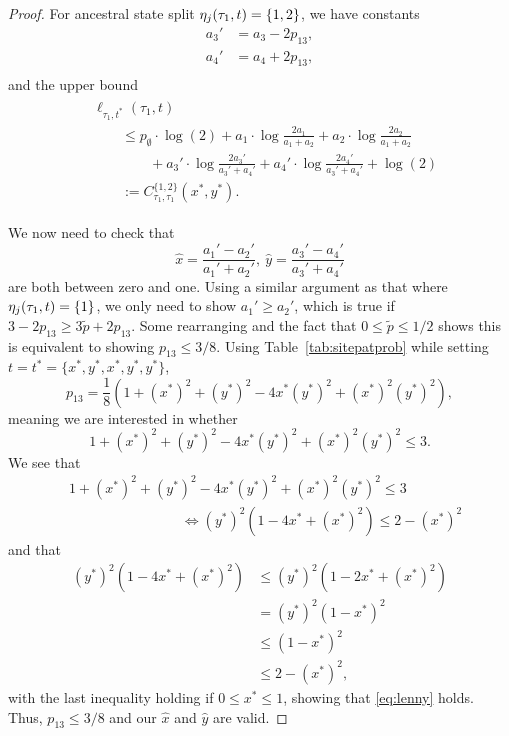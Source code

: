 \begin{proof}
For ancestral state split $\eta_j(\tau_1, t) = \{1,2\}$, we have constants
\begin{equation}
    \begin{aligned}
        a_{3}' &= a_{3}-2p_{13}, \\
        a_{4}' &= a_{4}+2p_{13}, \\
    \end{aligned}
    \label{eq:a_const_prime_y}
\end{equation}
and the upper bound
\begin{align}
\begin{split}
&    \ell_{\tau_1,t^*}(\tau_1, t) \\
&\qquad\le      p_{\emptyset}  \cdot\log(2)
+ a_{1}\cdot\log\frac{2a_{1}}{a_{1}+a_{2}}
+ a_{2}\cdot\log\frac{2a_{2}}{a_{1}+a_{2}} \\
&\qquad\qquad+ a_{3}'\cdot\log\frac{2a_{3}'}{a_{3}'+a_{4}'}
+ a_{4}'\cdot\log\frac{2a_{4}'}{a_{3}'+a_{4}'}
+ \log(2) \\
&\qquad := C^{\{1,2\}}_{\tau_1,\tau_1}(x^*, y^*).
\end{split}
\label{eq:farris-upper-bound-12}
\end{align}

We now need to check that
\[
\hat{x} = \frac{a_{1}'-a_{2}'}{a_{1}'+a_{2}'}, \ \hat{y} = \frac{a_{3}'-a_{4}'}{a_{3}'+a_{4}'}
\]
are both between zero and one.
Using a similar argument as that where $\eta_j(\tau_1, t) = \{1\}$, we only need to show $a_1' \ge a_2'$, which is true if $3-2p_{13} \ge 3\tilde{p}+2p_{13}$.
Some rearranging and the fact that $0 \le \tilde{p} \le 1/2$ shows this is equivalent to showing $p_{13} \le 3/8$.
Using Table~\ref{tab:sitepatprob} while setting $t=t^*=\{x^*,y^*,x^*,y^*,y^*\}$,
\[
p_{13} = \frac{1}{8}\left(1 + (x^*)^2 + (y^*)^2 - 4x^*(y^*)^2 + (x^*)^2(y^*)^2\right),
\]
meaning we are interested in whether
\begin{equation}
1 + (x^*)^2 + (y^*)^2 - 4x^*(y^*)^2 + (x^*)^2(y^*)^2 \le 3.
\label{eq:generating_ineq}
\end{equation}
We see that
\begin{equation}
\begin{split}
& 1 + (x^*)^2 + (y^*)^2 - 4x^*(y^*)^2 + (x^*)^2(y^*)^2 \le 3 \\
& \qquad \qquad \qquad \qquad \iff (y^*)^2\left(1 - 4x^* + (x^*)^2\right) \le 2 - (x^*)^2
\end{split}
\label{eq:lenny}
\end{equation}
and that
\begin{align*}
(y^*)^2\left(1 - 4x^* + (x^*)^2\right) &\le (y^*)^2\left(1 - 2x^* + (x^*)^2\right) \\
                                       &=   (y^*)^2\left(1 - x^*\right)^2 \\
                                       &\le        \left(1 - x^*\right)^2 \\
                                       &\le              2 - (x^*)^2,
\end{align*}
with the last inequality holding if $0 \le x^* \le 1$, showing that \eqref{eq:lenny} holds.
Thus, $p_{13} \le 3/8$ and our $\hat{x}$ and $\hat{y}$ are valid.


\end{proof}
